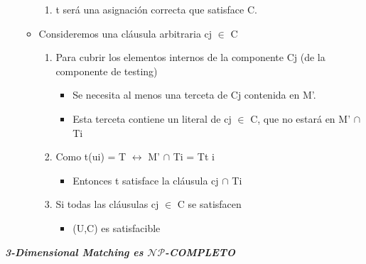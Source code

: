 \documentclass[a4paper,10pt]{article}
\begin{document}
\begin{itemize}
\begin{itemize}
						\begin{enumerate}
							\item t será una asignación correcta que satisface C. 
						\end{enumerate}
					\item Consideremos una cláusula arbitraria cj $\in$ C 
						\begin{enumerate}
							\item Para cubrir los elementos internos de la componente Cj (de la componente de testing) 
								\begin{itemize}
									\item Se necesita al menos una terceta de Cj contenida en M'. 
									\item Esta terceta contiene un literal de cj $\in$ C, que no estará en M' $\cap$ Ti
								\end{itemize}
							\item Como t(ui) = T $\leftrightarrow$ M' $\cap$ Ti = Tt i
								\begin{itemize}
									\item Entonces t satisface la cláusula cj  $\cap$ Ti
								\end{itemize} 
							\item Si todas las cláusulas cj $\in$ C se satisfacen 
								\begin{itemize}
									\item (U,C) es satisfacible
								\end{itemize} 
						\end{enumerate}
				\end{itemize}
			
		\end{itemize}
		  
						\textit{\textbf{3-Dimensional Matching es $\mathcal{NP}$-COMPLETO}}
\clearpage
\printglossary[type=\acronymtype]
\end{document}
